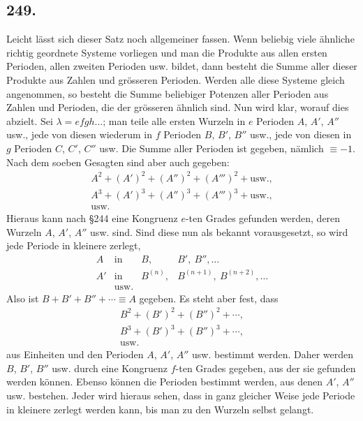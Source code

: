 \documentclass[12pt]{article}
\begin{document}
\subsection*{249.}
Leicht lässt sich dieser Satz noch allgemeiner fassen. Wenn beliebig viele ähnliche richtig geordnete Systeme vorliegen und man die Produkte aus allen ersten Perioden, allen zweiten Perioden usw. bildet, dann besteht die Summe aller dieser Produkte aus Zahlen und grösseren Perioden. Werden alle diese Systeme gleich angenommen, so besteht die Summe beliebiger Potenzen aller Perioden aus Zahlen und Perioden, die der grösseren ähnlich sind. Nun wird klar, worauf dies abzielt. Sei $\lambda=efgh\ldots$; man teile alle ersten Wurzeln in $e$ Perioden $A$, $A'$, $A''$ usw., jede von diesen wiederum in $f$ Perioden $B$, $B'$, $B''$ usw., jede von diesen in $g$ Perioden $C$, $C'$, $C''$ usw. Die Summe aller Perioden ist gegeben, nämlich $\equiv -1$. Nach dem soeben Gesagten sind aber auch gegeben:
\[
\begin{gathered}
A^2+(A')^2+(A'')^2+(A''')^2+\text{usw.},\\
A^3+(A')^3+(A'')^3+(A''')^3+\text{usw.},\\
\text{usw.}
\end{gathered}
\]
Hieraus kann nach §244 eine Kongruenz $e$-ten Grades gefunden werden, deren Wurzeln $A$, $A'$, $A''$ usw. sind. Sind diese nun als bekannt vorausgesetzt, so wird jede Periode in kleinere zerlegt,
\[
\begin{array}{llll}
A&\text{in}& B,&B',\ B'',\ldots\\
A'&\text{in}& B^{(n)},&B^{(n+1)},\ B^{(n+2)},\ldots\\
&\text{usw.}
\end{array}
\]
Also ist $B+B'+B''+\cdots\equiv A$ gegeben. Es steht aber fest, dass
\[
\begin{gathered}
B^2+(B')^2+(B'')^2+\cdots,\\
B^3+(B')^3+(B'')^3+\cdots,\\
\text{usw.}
\end{gathered}
\]
aus Einheiten und den Perioden $A$, $A'$, $A''$ usw. bestimmt werden. Daher werden $B$, $B'$, $B''$ usw. durch eine Kongruenz $f$-ten Grades gegeben, aus der sie gefunden werden können. Ebenso können die Perioden bestimmt werden, aus denen $A'$, $A''$ usw. bestehen. Jeder wird hieraus sehen, dass in ganz gleicher Weise jede Periode in kleinere zerlegt werden kann, bis man zu den Wurzeln selbst gelangt.
\end{document}
